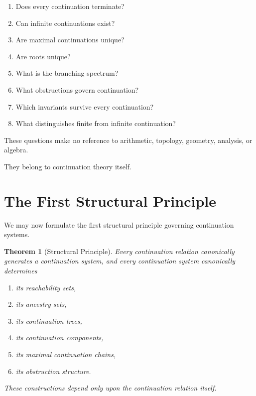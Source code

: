 \documentclass[13pt,openany]{book}
\theoremstyle{plain}
\newtheorem{theorem}{Theorem}[chapter]
\theoremstyle{definition}
\begin{document}
\begin{enumerate}

\item Does every continuation terminate?

\item Can infinite continuations exist?

\item Are maximal continuations unique?

\item Are roots unique?

\item What is the branching spectrum?

\item What obstructions govern continuation?

\item Which invariants survive every continuation?

\item What distinguishes finite from infinite continuation?

\end{enumerate}

These questions make no reference to arithmetic, topology, geometry,
analysis, or algebra.

They belong to continuation theory itself.

\section{The First Structural Principle}

We may now formulate the first structural principle governing continuation
systems.

\begin{theorem}[Structural Principle]
Every continuation relation canonically generates a continuation system,
and every continuation system canonically determines

\begin{enumerate}

\item its reachability sets,

\item its ancestry sets,

\item its continuation trees,

\item its continuation components,

\item its maximal continuation chains,

\item its obstruction structure.

\end{enumerate}

These constructions depend only upon the continuation relation itself.
\end{theorem}
\end{document}
